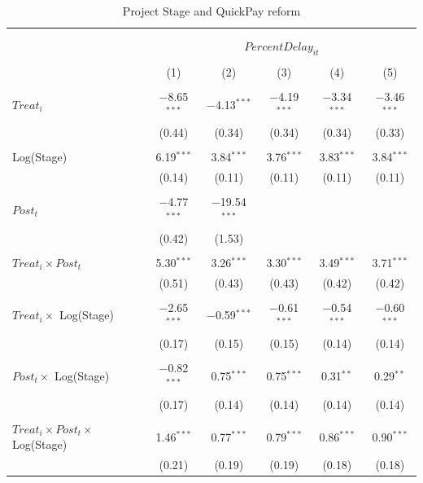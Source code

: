 \documentclass[
]{article}
\begin{document}
\begin{table}[H] \centering 
  \caption{Project Stage and QuickPay reform} 
  \label{} 
\small 
\begin{tabular}{@{\extracolsep{-2pt}}lccccc} 
\\[-1.8ex]\hline 
\hline \\[-1.8ex] 
\\[-1.8ex] & \multicolumn{5}{c}{$PercentDelay_{it}$  } \\ 
\\[-1.8ex] & (1) & (2) & (3) & (4) & (5)\\ 
\hline \\[-1.8ex] 
 $Treat_i$ & $-$8.65$^{***}$ & $-$4.13$^{***}$ & $-$4.19$^{***}$ & $-$3.34$^{***}$ & $-$3.46$^{***}$ \\ 
  & (0.44) & (0.34) & (0.34) & (0.34) & (0.33) \\ 
  & & & & & \\ 
 Log(Stage) & 6.19$^{***}$ & 3.84$^{***}$ & 3.76$^{***}$ & 3.83$^{***}$ & 3.84$^{***}$ \\ 
  & (0.14) & (0.11) & (0.11) & (0.11) & (0.11) \\ 
  & & & & & \\ 
 $Post_t$ & $-$4.77$^{***}$ & $-$19.54$^{***}$ &  &  &  \\ 
  & (0.42) & (1.53) &  &  &  \\ 
  & & & & & \\ 
 $Treat_i \times Post_t$ & 5.30$^{***}$ & 3.26$^{***}$ & 3.30$^{***}$ & 3.49$^{***}$ & 3.71$^{***}$ \\ 
  & (0.51) & (0.43) & (0.43) & (0.42) & (0.42) \\ 
  & & & & & \\ 
 $Treat_i \times$ Log(Stage) & $-$2.65$^{***}$ & $-$0.59$^{***}$ & $-$0.61$^{***}$ & $-$0.54$^{***}$ & $-$0.60$^{***}$ \\ 
  & (0.17) & (0.15) & (0.15) & (0.14) & (0.14) \\ 
  & & & & & \\ 
 $Post_t \times$ Log(Stage) & $-$0.82$^{***}$ & 0.75$^{***}$ & 0.75$^{***}$ & 0.31$^{**}$ & 0.29$^{**}$ \\ 
  & (0.17) & (0.14) & (0.14) & (0.14) & (0.14) \\ 
  & & & & & \\ 
 $Treat_i \times Post_t \times$ Log(Stage) & 1.46$^{***}$ & 0.77$^{***}$ & 0.79$^{***}$ & 0.86$^{***}$ & 0.90$^{***}$ \\ 
  & (0.21) & (0.19) & (0.19) & (0.18) & (0.18) \\ 

\end{tabular}
\end{table}
\end{document}
